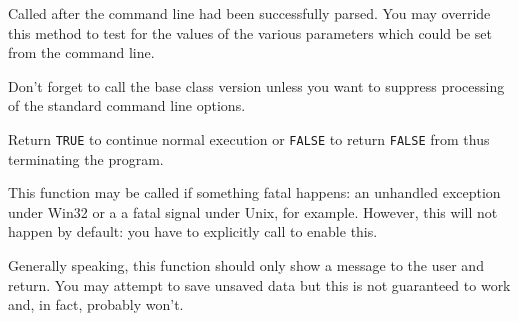 

\label{wxapponcmdlineparsed}


Called after the command line had been successfully parsed. You may override
this method to test for the values of the various parameters which could be
set from the command line.

Don't forget to call the base class version unless you want to suppress
processing of the standard command line options.

Return {\tt TRUE} to continue normal execution or {\tt FALSE} to return 
{\tt FALSE} from  thus terminating the program.



\label{wxapponfatalexception}


This function may be called if something fatal happens: an unhandled
exception under Win32 or a a fatal signal under Unix, for example. However,
this will not happen by default: you have to explicitly call 
 to enable this.

Generally speaking, this function should only show a message to the user and
return. You may attempt to save unsaved data but this is not guaranteed to
work and, in fact, probably won't.



